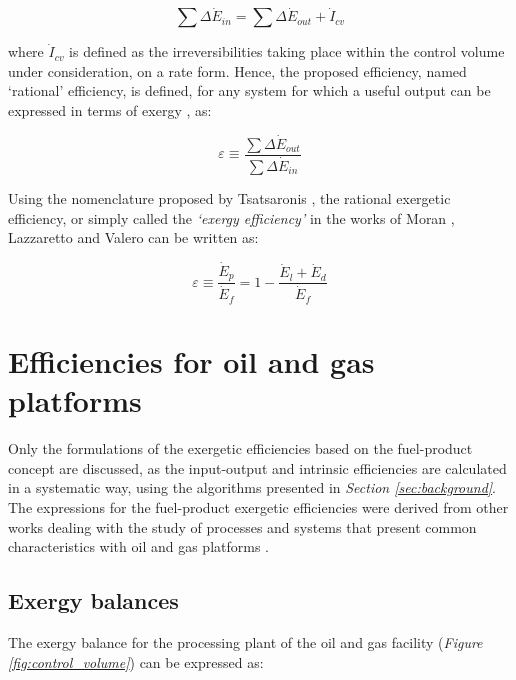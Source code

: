 \documentclass[times,3p]{elsarticle}
\begin{document}
\begin{equation}
	\sum \Delta \dot{E}_{in}=\sum \Delta \dot{E}_{out}+\dot{I}_{cv}
\end{equation} 
 
	where $\dot{I}_{cv}$ is defined as the irreversibilities taking place within the control volume under consideration, on a rate form. Hence, the proposed efficiency, named `rational' efficiency, is defined, for any system for which a useful output can be expressed in terms of exergy \cite{Kotas1980a,BejanAdrian;TsatsaronisGeorge;Moran1996}, as: 
 
 \begin{equation}
	\varepsilon \equiv \frac{\sum \Delta \dot{E}_{out}}{\sum \Delta \dot{E}_{in}}
\end{equation}
 
Using the nomenclature proposed by Tsatsaronis \cite{Tsatsaronis2007}, the rational exergetic efficiency, or simply called the \emph{`exergy efficiency'} in the works of Moran \cite{Moran1989,Moran2007}, Lazzaretto \cite{Lazzaretto1999,Lazzaretto2006} and Valero \cite{Valero1987} can be written as:

\begin{equation}
	\varepsilon \equiv \frac{\dot{E}_p}{\dot{E}_f} = 1-\frac{\dot{E}_l+\dot{E}_d}{\dot{E}_f}
\end{equation} 
 
 \section{Efficiencies for oil and gas platforms}
 \label{sec:efficiency}
 
Only the formulations of the exergetic efficiencies based on the fuel-product concept are discussed, as the input-output and intrinsic efficiencies are calculated in a systematic way, using the algorithms presented in \emph{Section \ref{sec:background}}. The expressions for the fuel-product exergetic efficiencies were derived from other works dealing with the study of processes and systems that present common characteristics with oil and gas platforms \cite{Oliveira1997,Cornelissen1997,Voldsund2010,Voldsund2012,Rian2012}. 
 
 \subsection{Exergy balances}
 
The exergy balance for the processing plant of the oil and gas facility (\emph{Figure \ref{fig:control_volume}}) can be expressed as:
\end{document}
